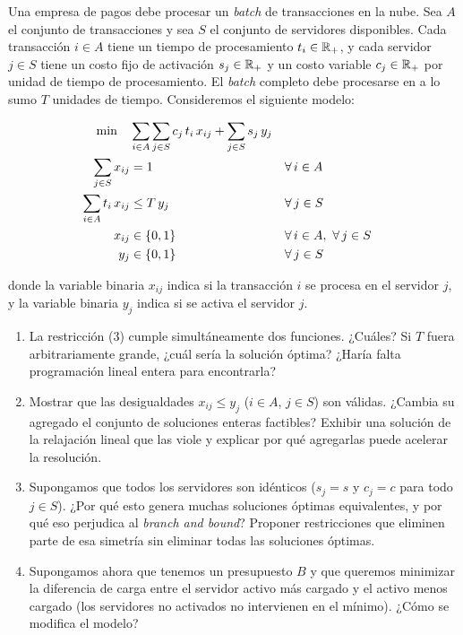\documentclass[11pt,a4paper]{article}
\begin{document}

Una empresa de pagos debe procesar un \emph{batch} de transacciones en la
nube. Sea $A$ el conjunto de transacciones y sea $S$ el
conjunto de servidores disponibles. Cada transacción $i \in A$ tiene un tiempo
de procesamiento $t_i \in \mathbb{R}_+$, y cada servidor $j \in S$ tiene un costo fijo de
activación $s_j \in \mathbb{R}_+$ y un costo variable $c_j \in \mathbb{R}_+$ por unidad de tiempo
de procesamiento. El \emph{batch} completo debe procesarse en a lo sumo $T$
unidades de tiempo. Consideremos el siguiente modelo:

\begin{align}
\min \quad & \sum_{i \in A} \sum_{j \in S} c_j\, t_i\, x_{ij}
           + \sum_{j \in S} s_j\, y_j \\
\sum_{j \in S} x_{ij} &= 1 && \forall\, i \in A \\
\sum_{i \in A} t_i\, x_{ij} &\le T\, y_j && \forall\, j \in S \\
x_{ij} &\in \{0,1\} && \forall\, i \in A,\ \forall\, j \in S \notag \\
y_j &\in \{0,1\} && \forall\, j \in S \notag
\end{align}

donde la variable binaria $x_{ij}$ indica si la transacción $i$ se procesa en el
servidor $j$, y la variable binaria $y_j$ indica si se activa el servidor $j$.

\begin{enumerate}
  \item La restricción (3) cumple simultáneamente dos funciones. ¿Cuáles? Si
  $T$ fuera arbitrariamente grande, ¿cuál sería la solución óptima? ¿Haría
  falta programación lineal entera para encontrarla?

  \item Mostrar que las desigualdades $x_{ij} \le y_j$ ($i \in A$, $j \in S$)
  son válidas. ¿Cambia su agregado el conjunto de soluciones enteras factibles?
  Exhibir una solución de la relajación lineal que las viole y explicar por qué
  agregarlas puede acelerar la resolución.

  \item Supongamos que todos los servidores son idénticos ($s_j = s$ y $c_j = c$
  para todo $j \in S$). ¿Por qué esto genera muchas soluciones óptimas
  equivalentes, y por qué eso perjudica al \emph{branch and bound}? Proponer restricciones que eliminen parte de esa simetría sin
  eliminar todas las soluciones óptimas.

  \item Supongamos ahora que tenemos un presupuesto $B$ y que queremos
  minimizar la diferencia de carga entre el servidor activo más cargado y el
  activo menos cargado (los servidores no activados no intervienen en el
  mínimo). ¿Cómo se modifica el modelo?
\end{enumerate}
\end{document}

